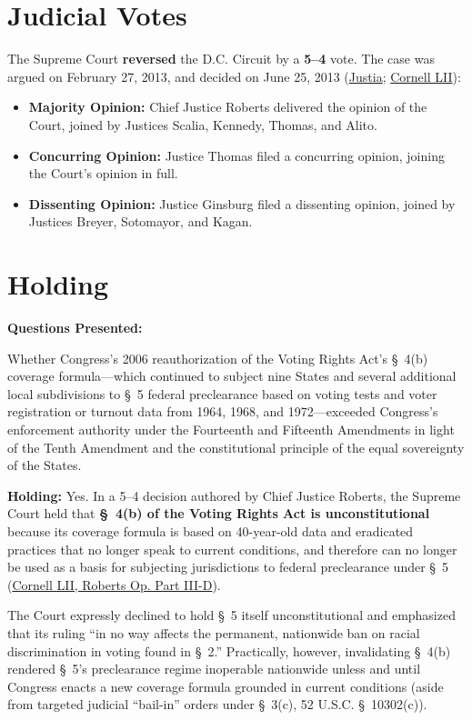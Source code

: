 \documentclass[12pt]{article}
\begin{document}
\section{Judicial Votes}
The Supreme Court \textbf{reversed} the D.C. Circuit by a \textbf{5--4} vote. The case was argued on February 27, 2013, and decided on June 25, 2013 (\href{https://supreme.justia.com/cases/federal/us/570/529/}{Justia}; \href{https://www.law.cornell.edu/supremecourt/text/12-96}{Cornell LII}):

\begin{itemize}
    \item \textbf{Majority Opinion:} Chief Justice Roberts delivered the opinion of the Court, joined by Justices Scalia, Kennedy, Thomas, and Alito.
    \item \textbf{Concurring Opinion:} Justice Thomas filed a concurring opinion, joining the Court's opinion in full.
    \item \textbf{Dissenting Opinion:} Justice Ginsburg filed a dissenting opinion, joined by Justices Breyer, Sotomayor, and Kagan.
\end{itemize}

\section{Holding}
\textbf{Questions Presented:}

Whether Congress's 2006 reauthorization of the Voting Rights Act's \S~4(b) coverage formula---which continued to subject nine States and several additional local subdivisions to \S~5 federal preclearance based on voting tests and voter registration or turnout data from 1964, 1968, and 1972---exceeded Congress's enforcement authority under the Fourteenth and Fifteenth Amendments in light of the Tenth Amendment and the constitutional principle of the equal sovereignty of the States.

\textbf{Holding:} Yes. In a 5--4 decision authored by Chief Justice Roberts, the Supreme Court held that \textbf{\S~4(b) of the Voting Rights Act is unconstitutional} because its coverage formula is based on 40-year-old data and eradicated practices that no longer speak to current conditions, and therefore can no longer be used as a basis for subjecting jurisdictions to federal preclearance under \S~5 (\href{https://www.law.cornell.edu/supremecourt/text/12-96}{Cornell LII, Roberts Op. Part III-D}).

The Court expressly declined to hold \S~5 itself unconstitutional and emphasized that its ruling ``in no way affects the permanent, nationwide ban on racial discrimination in voting found in \S~2.'' Practically, however, invalidating \S~4(b) rendered \S~5's preclearance regime inoperable nationwide unless and until Congress enacts a new coverage formula grounded in current conditions (aside from targeted judicial ``bail-in'' orders under \S~3(c), 52 U.S.C. \S~10302(c)).
\end{document}
